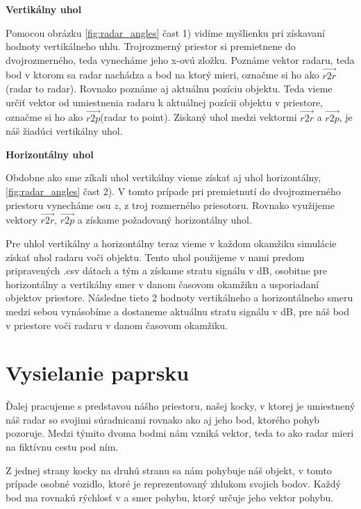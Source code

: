\documentclass[slovak]{ExcelAtFIT} %
\begin{document}
    \textbf{Vertikálny uhol}

      Pomocou obrázku \ref{fig:radar_angles} čast 1) vidíme myšlienku pri získavaní hodnoty vertikálneho uhlu. Trojrozmerný priestor si premietnene do dvojrozmerného, teda vynecháme jeho x-ovú zložku.
      Poznáme vektor radaru, teda bod v ktorom sa radar nachádza a bod na ktorý mieri, označme si ho ako $\overrightarrow{r2r}$(radar to radar).
      Rovnako poznáme aj aktuálnu pozíciu objektu. Teda vieme určiť vektor od umiestnenia radaru k aktuálnej pozícii objektu v priestore, označme si ho ako $\overrightarrow{r2p}$(radar to point).
      Ziskaný uhol medzi vektormi $\overrightarrow{r2r}$ a $\overrightarrow{r2p}$, je náš žiadúci vertikálny uhol. 

    \textbf{Horizontálny uhol}

      Obdobne ako sme zíkali uhol vertikálny vieme získať aj uhol horizontálny, \ref{fig:radar_angles} čast 2). V tomto prípade pri premietnutí do dvojrozmerného priestoru vynecháme osu $z$, z troj rozmerného priesotoru.
      Rovnako využijeme vektory $\overrightarrow{r2r}$, $\overrightarrow{r2p}$ a získame požadovaný horizontálny uhol.
    \newline

    Pre uhlol vertikálny a horizontálny teraz vieme v každom okamžiku simulácie získať uhol radaru voči objektu. Tento uhol použijeme v nami predom pripravených .csv dátach a tým a získame stratu signálu v dB, osobitne pre horizontálny a vertikálny smer v danom časovom okamžiku a usporiadaní objektov priestore. Následne tieto 2 hodnoty vertikálneho a horizontálneho smeru medzi sebou vynásobíme a dostaneme aktuálnu stratu signálu v dB, pre náš bod v priestore voči radaru v danom časovom okamžiku. 
  
  \section{Vysielanie paprsku}
    \hspace{0.6cm}Ďalej pracujeme s predstavou nášho priestoru, našej kocky, v ktorej je umiestnený náš radar so svojimi súradnicami rovnako ako aj jeho bod, ktorého pohyb pozoruje. Medzi týmito dvoma bodmi nám vzniká vektor, teda to ako radar mieri na fiktívnu cestu pod ním.

    Z jednej strany kocky na druhú stranu sa nám pohybuje náš objekt, v tomto prípade osobné vozidlo, ktoré je reprezentovaný zhlukom svojich bodov. Každý bod ma rovnakú rýchlosť v a smer pohybu, ktorý určuje jeho vektor pohybu.
\end{document}
